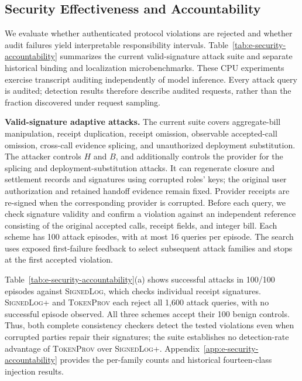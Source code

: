 \subsection{Security Effectiveness and Accountability}
\label{sec:evaluation-security}

We evaluate whether authenticated protocol violations are rejected and whether
audit failures yield interpretable responsibility intervals.
Table~\ref{tab:e-security-accountability} summarizes the current valid-signature
attack suite and separate historical binding and localization microbenchmarks.
These CPU experiments exercise transcript auditing independently of model inference.
Every attack query is audited; detection results therefore describe audited
requests, rather than the fraction discovered under request sampling.



\noindent\textbf{Valid-signature adaptive attacks.}
The current suite covers aggregate-bill manipulation, receipt duplication,
receipt omission, observable accepted-call omission, cross-call evidence
splicing, and unauthorized deployment substitution.
The attacker controls $H$ and $B$, and additionally controls the provider for
the splicing and deployment-substitution attacks.
It can regenerate closure and settlement records and signatures using corrupted
roles' keys; the original user authorization and retained handoff evidence
remain fixed.
Provider receipts are re-signed when the corresponding provider is corrupted.
Before each query, we check signature validity and confirm a violation against
an independent reference consisting of the original accepted calls, receipt
fields, and integer bill.
Each scheme has 100 attack episodes, with at most 16 queries per episode.
The search uses exposed first-failure feedback to select subsequent attack
families and stops at the first accepted violation.

Table~\ref{tab:e-security-accountability}(a) shows successful attacks in
100/100 episodes against \textsc{SignedLog}, which checks individual receipt
signatures. \textsc{SignedLog+} and \textsc{TokenProv} each reject all 1,600
attack queries, with no successful episode observed.
All three schemes accept their 100 benign controls.
Thus, both complete consistency checkers detect the tested violations even
when corrupted parties repair their signatures; the suite establishes no
detection-rate advantage of \textsc{TokenProv} over \textsc{SignedLog+}.
Appendix~\ref{app:e-security-accountability} provides the per-family counts
and historical fourteen-class injection results.

